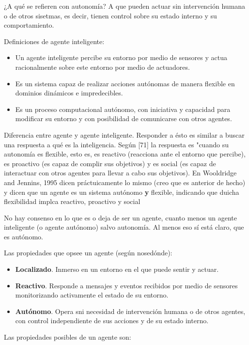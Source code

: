 ¿A qué se refieren con autonomía? A que pueden actuar sin intervención humana o de otros sisetmas, es decir, tienen control sobre su estado interno y su comportamiento.

Definiciones de agente inteligente:

\begin{itemize}
	\item Un agente inteligente percibe su entorno por medio de sensores y actua racionalmente sobre este entorno por medio de actuadores.
	\item Es un sistema capaz de realizar acciones autónomas de manera flexible en dominios 	dinámicos e impredecibles.
	\item Es un proceso computacional autónomo, con iniciativa y capacidad para modificar su entorno y con posibilidad de comunicarse con otros agentes.
\end{itemize}

Diferencia entre agente y agente inteligente. Responder a ésto es similar a buscar una respuesta a qué es la inteligencia. Según [71] la respuesta es "cuando su autonomía es flexible, esto es, es reactivo (reacciona ante el entorno que percibe), es proactivo (es capaz de complir sus objetivos) y es social (es capaz de interactuar con otros agentes para llevar a cabo sus objetivos). En Wooldridge and Jennins, 1995 dicen práctuicamente lo mismo (creo que es anterior de hecho) y dicen que un agente es un sistema autónomo \textbf{y} flexible, indicando que duicha flexibilidad implca reactivo, proactivo y social

No hay consenso en lo que es o deja de ser un agente, cuanto menos un agente inteligente (o agente autónomo) salvo autonomía. Al menos eso sí está claro, que es autónomo.

Las propiedades que opsee un agente (según nosedónde):

\begin{itemize}
	\item \textbf{Localizado}. Inmerso en un entorno en el que puede sentir y actuar.
	\item \textbf{Reactivo}. Responde a mensajes y eventos recibidos por medio de sensores monitorizando activamente el estado de su entorno.
	\item \textbf{Autónomo}. Opera sni necesidad de intervención humana o de otros agentes, con control independiente de sus acciones y de su estado interno.
\end{itemize}

Las propiedades posibles de un agente son:


